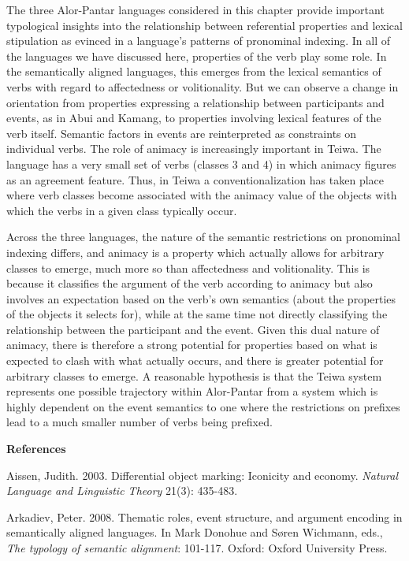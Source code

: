 The three Alor-Pantar languages considered in this chapter provide important typological insights into the relationship between referential properties and lexical stipulation as evinced in a language{\textquoteright}s patterns of pronominal indexing. In all of the languages we have discussed here, properties of the verb play some role. In the semantically aligned languages, this emerges from the lexical semantics of verbs with regard to affectedness or volitionality. But we can observe a change in orientation from properties expressing a relationship between participants and events, as in Abui and Kamang, to properties involving lexical features of the verb itself. Semantic factors in events are reinterpreted as constraints on individual verbs. The role of animacy is increasingly important in Teiwa. The language has a very small set of verbs (classes 3 and 4) in which animacy figures as an agreement feature. Thus, in Teiwa a conventionalization has taken place where verb classes become associated with the 
animacy value of the objects with which the verbs in a given class typically occur.

Across the three languages, the nature of the semantic restrictions on pronominal indexing differs, and animacy is a property which actually allows for arbitrary classes to emerge, much more so than affectedness and volitionality. This is because it classifies the argument of the verb according to animacy but also involves an expectation based on the verb{\textquoteright}s own semantics (about the properties of the objects it selects for), while at the same time not directly classifying the relationship between the participant and the event. Given this dual nature of animacy, there is therefore a strong potential for properties based on what is expected to clash with what actually occurs, and there is greater potential for arbitrary classes to emerge. A reasonable hypothesis is that the Teiwa system represents one possible trajectory within Alor-Pantar from a system which is highly dependent on the event semantics to one where the restrictions on prefixes lead to a much smaller number of verbs being prefixed.
 

{\bfseries
References}

Aissen, Judith. 2003. Differential object marking: Iconicity and economy. \textit{Natural Language and Linguistic Theory} 21(3): 435-483.

Arkadiev, Peter. 2008. Thematic roles, event structure, and argument encoding in semantically aligned languages. In Mark Donohue and S{\o}ren Wichmann, eds., \textit{The typology of semantic alignment}: 101-117. Oxford: Oxford University Press.

